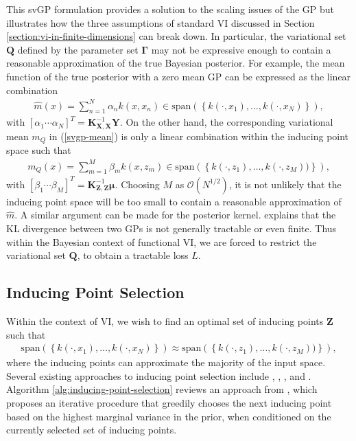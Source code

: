 \documentclass{article}
\numberwithin{equation}{section}
\begin{document}
This svGP formulation provides a solution to the scaling issues of the GP but illustrates how the three assumptions of standard VI discussed in Section \ref{section:vi-in-finite-dimensions} can break down.
In particular, the variational set $\mathbf{Q}$ defined by the parameter set $\boldsymbol{\Gamma}$ may not be expressive enough to contain a reasonable approximation of the true Bayesian posterior.
For example, the mean function of the true posterior with a zero mean GP can be expressed as the linear combination
\begin{align}
    \hat{m}(x) = \sum_{n=1}^{N} \alpha_n k(x, x_n) \in \text{span} \left(\left\{k(\cdot, x_1), \dots, k(\cdot, x_N)\right\}\right),
\end{align}
with $\left[\alpha_1 \cdots \alpha_N\right]^T = \mathbf{K}_{\mathbf{X}, \mathbf{X}}^{-1}\mathbf{Y}$.
On the other hand, the corresponding variational mean $m_Q$ in (\ref{svgp-mean}) is only a linear combination within the inducing point space such that
\begin{align}
    m_Q(x) = \sum_{m=1}^{M} \beta_m k(x, z_m) \in \text{span}\left(\left\{k(\cdot, z_1), \dots, k(\cdot, z_M))\right\}\right),
\end{align}
with $\left[\beta_1 \cdots \beta_M\right]^T = \mathbf{K}_{\mathbf{Z}, \mathbf{Z}}^{-1}\boldsymbol{\mu}$.
Choosing $M$ as $\mathcal{O}(N^{1/2})$, it is not unlikely that the inducing point space will be too small to contain a reasonable approximation of $\hat{m}$.
A similar argument can be made for the posterior kernel.
\cite{burt2020understanding} explains that the KL divergence between two GPs is not generally tractable or even finite.
Thus within the Bayesian context of functional VI, we are forced to restrict the variational set $\boldsymbol{Q}$, to obtain a tractable loss $L$.

\subsection{Inducing Point Selection}\label{section:inducing-point-selection}
Within the context of VI, we wish to find an optimal set of inducing points $\mathbf{Z}$ such that
\begin{align}
    \text{span} \left(\left\{k(\cdot, x_1), \dots, k(\cdot, x_N)\right\}\right) \approx \text{span}\left(\left\{k(\cdot, z_1), \dots, k(\cdot, z_M))\right\}\right),
    \label{inducing-point-input-space}
\end{align}
where the inducing points can approximate the majority of the input space. 
Several existing approaches to inducing point selection include \cite{smola2000sparse}, \cite{hensman2015scalable}, \cite{li2016fast}, and \cite{alaoui2015fast}.
Algorithm \ref{alg:inducing-point-selection} reviews an approach from \cite{burt2020convergence}, which proposes an iterative procedure that greedily chooses the next inducing point based on the highest marginal variance in the prior, when conditioned on the currently selected set of inducing points.
\end{document}
